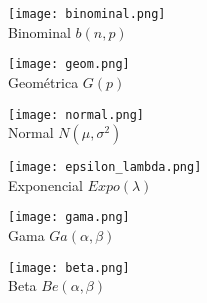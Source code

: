 \begin{figure}[H]\centering\caption[Distribuciones]{Diversas de distribuciones pueden modelar v.a.s, a continuación se muestran las mas importantes de acuerdo a \citeauthor{bala20} (\citeyear{bala20}).}\label{FIG:DISTS}
\begin{subfigure}[t]{.3\textwidth}\texttt{[image: binominal.png]}\centering\\Binominal $b(n,p)$\end{subfigure}\quad
\begin{subfigure}[t]{.3\textwidth}\texttt{[image: geom.png]}\centering\\Geométrica $G(p)$\end{subfigure}\quad
\begin{subfigure}[t]{.3\textwidth}\texttt{[image: normal.png]}\centering\\Normal $N(\mu,\sigma^2)$\end{subfigure}\quad
\begin{subfigure}[t]{.3\textwidth}\texttt{[image: epsilon\_lambda.png]}\\Exponencial $Expo(\lambda)$\end{subfigure}\quad
\begin{subfigure}[t]{.3\textwidth}\texttt{[image: gama.png]}\centering\\Gama $Ga(\alpha,\beta)$\end{subfigure}\quad
\begin{subfigure}[t]{.3\textwidth}\texttt{[image: beta.png]}\centering\\Beta $Be(\alpha,\beta)$\end{subfigure}
\end{figure}



